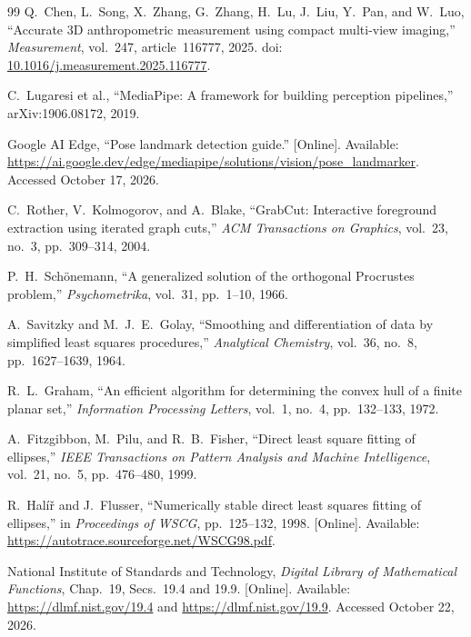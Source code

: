 \documentclass[11pt,a4paper]{article}
\begin{document}
\begin{thebibliography}{99}
Q.~Chen, L.~Song, X.~Zhang, G.~Zhang, H.~Lu, J.~Liu, Y.~Pan, and W.~Luo, ``Accurate 3D anthropometric measurement using compact multi-view imaging,'' \emph{Measurement}, vol.~247, article~116777, 2025. doi: \href{https://doi.org/10.1016/j.measurement.2025.116777}{10.1016/j.measurement.2025.116777}.

C.~Lugaresi et al., ``MediaPipe: A framework for building perception pipelines,'' arXiv:1906.08172, 2019.

Google AI Edge, ``Pose landmark detection guide.'' [Online]. Available: \url{https://ai.google.dev/edge/mediapipe/solutions/vision/pose_landmarker}. Accessed October 17, 2026.

C.~Rother, V.~Kolmogorov, and A.~Blake, ``GrabCut: Interactive foreground extraction using iterated graph cuts,'' \emph{ACM Transactions on Graphics}, vol.~23, no.~3, pp.~309--314, 2004.

P.~H.~Sch\"onemann, ``A generalized solution of the orthogonal Procrustes problem,'' \emph{Psychometrika}, vol.~31, pp.~1--10, 1966.

A.~Savitzky and M.~J.~E.~Golay, ``Smoothing and differentiation of data by simplified least squares procedures,'' \emph{Analytical Chemistry}, vol.~36, no.~8, pp.~1627--1639, 1964.

R.~L.~Graham, ``An efficient algorithm for determining the convex hull of a finite planar set,'' \emph{Information Processing Letters}, vol.~1, no.~4, pp.~132--133, 1972.

A.~Fitzgibbon, M.~Pilu, and R.~B.~Fisher, ``Direct least square fitting of ellipses,'' \emph{IEEE Transactions on Pattern Analysis and Machine Intelligence}, vol.~21, no.~5, pp.~476--480, 1999.

R.~Hal\'i\v r and J.~Flusser, ``Numerically stable direct least squares fitting of ellipses,'' in \emph{Proceedings of WSCG}, pp.~125--132, 1998. [Online]. Available: \url{https://autotrace.sourceforge.net/WSCG98.pdf}.

National Institute of Standards and Technology, \emph{Digital Library of Mathematical Functions}, Chap.~19, Secs.~19.4 and 19.9. [Online]. Available: \url{https://dlmf.nist.gov/19.4} and \url{https://dlmf.nist.gov/19.9}. Accessed October 22, 2026.


\end{thebibliography}
\end{document}
